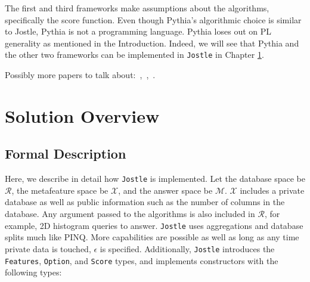 \documentclass[11pt]{report}
\newcommand{\Jostle}{\texttt{Jostle}}
\renewcommand{\t}[1]{\texttt{#1}}
\begin{document}
The first and third frameworks make assumptions about the algorithms, specifically the score function. Even though Pythia's algorithmic choice is similar to Jostle, Pythia is not a programming language. Pythia loses out on PL generality as mentioned in the Introduction. Indeed, we will see that Pythia and the other two frameworks can be implemented in \Jostle{} in Chapter \ref{ch:solution}.

Possibly more papers to talk about:~\cite{Winograd-Cort:2017},~\cite{Liu:2018},~\cite{Hsu:2014}.

\chapter{Solution Overview}\label{ch:solution}
\section{Formal Description}
Here, we describe in detail how \Jostle{} is implemented. Let the database space be $\mathcal{R}$, the metafeature space be $\mathcal{X}$, and the answer space be $\mathcal{M}$. $\mathcal{X}$ includes a private database as well as public information such as the number of columns in the database. Any argument passed to the algorithms is also included in $\mathcal{R}$, for example, 2D histogram queries to answer. \Jostle{} uses aggregations and database splits much like PINQ. More capabilities are possible as well as long as any time private data is touched, $\epsilon$ is specified. Additionally, \Jostle{} introduces the \t{Features}, \t{Option}, and \t{Score} types, and implements constructors with the following types:
\end{document}
